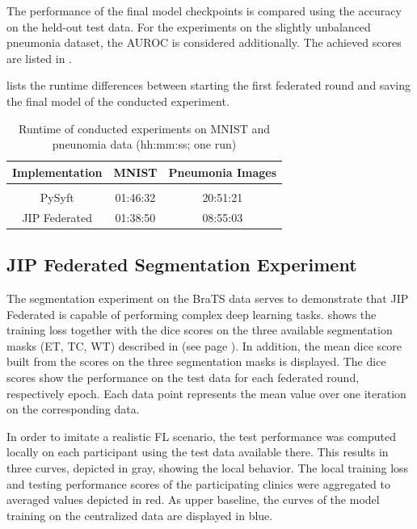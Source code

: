The performance of the final model checkpoints is compared using the accuracy on the held-out test data. 
For the experiments on the slightly unbalanced pneumonia dataset, the AUROC is considered additionally. The achieved scores are listed in .

 lists the runtime differences between starting the first federated round and saving the final model of the conducted experiment.

\begin{table}[htbp]
  \centering
  \begin{tabular}{ccc}
  Implementation & MNIST & Pneumonia Images \\
  \hline \\[-2.5ex] %
  PySyft        & 01:46:32 & 20:51:21 \\
  JIP Federated & 01:38:50 & 08:55:03 \\
 \end{tabular}
 \caption[Runtime of conducted experiments on MNIST and pneunomia data]{Runtime of conducted experiments on MNIST and pneunomia data (hh:mm:ss; one run)}
 \label{tab:RuntimeExp}
\end{table}




\subsection{JIP Federated Segmentation Experiment}
\label{subsec:ResultsSegmentation}

The segmentation experiment on the BraTS data serves to demonstrate that JIP Federated is capable of performing complex deep learning tasks.
 shows the training loss together with the dice scores on the three available segmentation masks (ET, TC, WT) described in  (see page \pageref{subsec:MethodsExperiments}). In addition, the mean dice score built from the scores on the three segmentation masks is displayed.
The dice scores show the performance on the test data for each federated round, respectively epoch. Each data point represents the mean value over one iteration on the corresponding data.

In order to imitate a realistic FL scenario, the test performance was computed locally on each participant using the test data available there. This results in three curves, depicted in gray, showing the local behavior. The local training loss and testing performance scores of the participating clinics were aggregated to averaged values depicted in red.
As upper baseline, the curves of the model training on the centralized data are displayed in blue.

